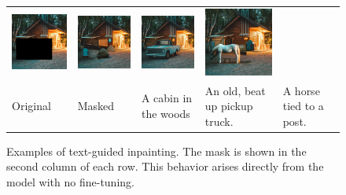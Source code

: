 \begin{figure}
\begin{tabular}{p{27mm}p{27mm}p{27mm}p{27mm}p{27mm}}
    \includegraphics[width=30mm]{figs/inpaint/18_masked} &
    \includegraphics[width=30mm]{figs/inpaint/18_synth_07} &
    \includegraphics[width=30mm]{figs/inpaint/old_pickup} &
    \includegraphics[width=30mm]{figs/inpaint/horse} 
    \\
    Original &
    Masked &
    {A cabin in the woods} & 
    {An old, beat up pickup truck.} & 
    {A horse tied to a post.} 
  \end{tabular}
  \caption{\small Examples of text-guided inpainting. The mask is shown in the second column of each row. This behavior arises directly from the model with no fine-tuning.}
  \label{fig:inpainting}
\end{figure}